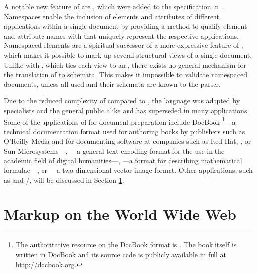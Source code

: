 A notable new feature of  are %
, which were added to the specification
\cite{bray99} in \citeyear{bray99}. Namespaces enable the inclusion of elements
and attributes of different  applications within a single
 document by providing a method to qualify element and attribute
names with  that uniquely represent the respective 
applications. Namespaced elements are a spiritual successor of a more
expressive  feature of
, which makes it possible
to mark up several structural views of a single document. Unlike with
, which ties each view to an  ,
there exists no general mechanism for the translation of  to
 schemata. This makes it impossible to validate namespaced
 documents, unless all used  and their schemata are
known to the parser.


Due to the reduced complexity of  compared to , the
language was adopted by specialists and the general public alike and has
superseded  in many applications. Some of the applications of
 for document preparation include DocBook%
\footnote{
  The authoritative resource on the DocBook  format is
  . The book itself is written in DocBook and its source code
  is publicly available in full at \url{http://docbook.org}.
}---a technical documentation format used for authoring books by publishers such
as O'Reilly Media and for documenting software at companies such as Red Hat,
, or Sun Microsystems---, ---a general text encoding
format for the use in the academic field of digital humanities---,
---a format for describing mathematical formulae---, or
---a two-dimensional vector image format. Other 
applications, such as  and /, will
be discussed in Section \ref{sec:www-markup}.
      
\section{Markup on the World Wide Web}\label{sec:www-markup}
